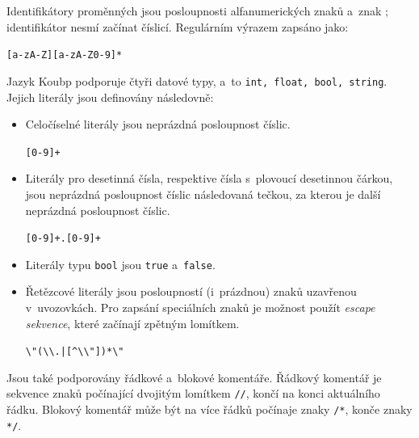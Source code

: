 Identifikátory proměnných jsou posloupnosti alfanumerických znaků a~znak \texttt{\textunderscore}; identifikátor nesmí začínat číslicí.
Regulárním výrazem zapsáno jako:
\begin{center}
    \texttt{[a-zA-Z\textunderscore][a-zA-Z0-9\textunderscore]*}
\end{center}

Jazyk Koubp podporuje čtyři datové typy, a~to \texttt{int, float, bool, string}.
Jejich literály jsou definovány následovně:
\begin{itemize}
    \item Celočíselné literály jsou neprázdná posloupnost číslic.
    \begin{center}
        \texttt{[0-9]+}
    \end{center} 
    \item Literály pro desetinná čísla, respektive čísla s~plovoucí desetinnou čárkou, jsou neprázdná posloupnost číslic následovaná tečkou, za kterou je další neprázdná posloupnost číslic.
    \begin{center}
        \texttt{[0-9]+.[0-9]+}
    \end{center}
    \item Literály typu \texttt{bool} jsou \texttt{true} a~\texttt{false}.
    \item Řetězcové literály jsou posloupností (i~prázdnou) znaků uzavřenou v~uvozovkách.
    Pro zapsání speciálních znaků je možnost použít \emph{escape sekvence}, které začínají zpětným lomítkem.
    \begin{center}
        \texttt{\textbackslash"(\textbackslash\textbackslash.|[\^{}\textbackslash\textbackslash"])*\textbackslash"}
    \end{center}
\end{itemize}

Jsou také podporovány řádkové a~blokové komentáře.
Řádkový komentář je sekvence znaků počínající dvojitým lomítkem \texttt{//}, končí na konci aktuálního řádku.
Blokový komentář může být na více řádků počínaje znaky \texttt{/*}, konče znaky \texttt{*/}.

